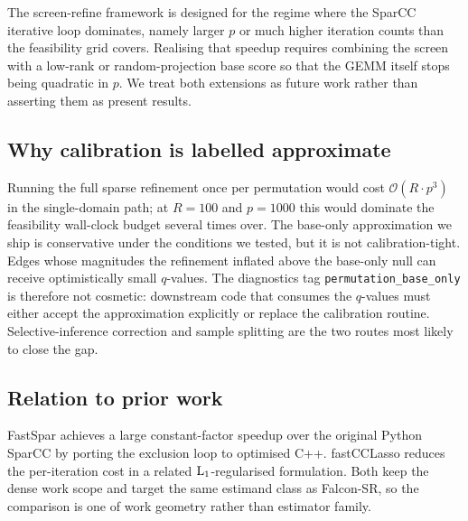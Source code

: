 \documentclass[unnumsec,webpdf,contemporary,large]{oup-authoring-template}
\theoremstyle{thmstyleone}
\theoremstyle{thmstyletwo}
\theoremstyle{thmstylethree}
\begin{document}
The screen-refine framework is designed for the regime where the
SparCC iterative loop dominates, namely larger $p$ or much higher
iteration counts than the feasibility grid covers. Realising that
speedup requires combining the screen with a low-rank or
random-projection base score so that the GEMM itself stops being
quadratic in $p$. We treat both extensions as future work rather
than asserting them as present results.

\subsection{Why calibration is labelled approximate}\label{sec:discuss-calib}

Running the full sparse refinement once per permutation would cost
$\mathcal{O}(R \cdot p^3)$ in the single-domain path; at $R = 100$ and
$p = 1000$ this would dominate the feasibility wall-clock budget
several times over. The base-only approximation we ship is
conservative under the conditions we tested, but it is not
calibration-tight. Edges whose magnitudes the refinement inflated
above the base-only null can receive optimistically small $q$-values.
The diagnostics tag \texttt{permutation\_base\_only} is therefore not
cosmetic: downstream code that consumes the $q$-values must either
accept the approximation explicitly or replace the calibration
routine. Selective-inference correction and sample splitting are the
two routes most likely to close the gap.

\subsection{Relation to prior work}\label{sec:discuss-related}

FastSpar \citep{watts2019fastspar} achieves a large constant-factor
speedup over the original Python SparCC by porting the exclusion loop
to optimised C++. fastCCLasso \citep{zhang2024fastcclasso} reduces the
per-iteration cost in a related ${\rm L}_1$-regularised formulation.
Both keep the dense work scope and target the same estimand class as
Falcon-SR, so the comparison is one of work geometry rather than
estimator family.
\end{document}
